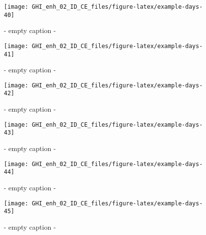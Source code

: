 \documentclass[
  10pt,
  a4paper,oneside]{article}
\begin{document}
\begin{figure}[H]

{\centering \texttt{[image: GHI\_enh\_02\_ID\_CE\_files/figure-latex/example-days-40]} 

}

\caption{ - empty caption - }\label{fig:example-days-40}
\end{figure}

\begin{figure}[H]

{\centering \texttt{[image: GHI\_enh\_02\_ID\_CE\_files/figure-latex/example-days-41]} 

}

\caption{ - empty caption - }\label{fig:example-days-41}
\end{figure}

\begin{figure}[H]

{\centering \texttt{[image: GHI\_enh\_02\_ID\_CE\_files/figure-latex/example-days-42]} 

}

\caption{ - empty caption - }\label{fig:example-days-42}
\end{figure}

\begin{figure}[H]

{\centering \texttt{[image: GHI\_enh\_02\_ID\_CE\_files/figure-latex/example-days-43]} 

}

\caption{ - empty caption - }\label{fig:example-days-43}
\end{figure}

\begin{figure}[H]

{\centering \texttt{[image: GHI\_enh\_02\_ID\_CE\_files/figure-latex/example-days-44]} 

}

\caption{ - empty caption - }\label{fig:example-days-44}
\end{figure}

\begin{figure}[H]

{\centering \texttt{[image: GHI\_enh\_02\_ID\_CE\_files/figure-latex/example-days-45]} 

}

\caption{ - empty caption - }\label{fig:example-days-45}
\end{figure}
\end{document}
